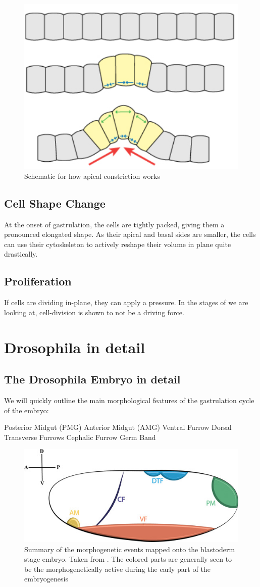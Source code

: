 \begin{figure}[H]
    \centering
    \includegraphics[width=0.3\linewidth]{chapters/Theory/figures/apical_constriction_schematic.png}
    \caption{Schematic for how apical constriction works}
    \label{fig:apical-constriction}
\end{figure}


\subsection{Cell Shape Change}
At the onset of gastrulation, the cells are tightly packed, giving them a pronounced elongated shape. As their apical and basal sides are smaller, the cells can use their cytoskeleton to actively reshape their volume in plane quite drastically. 

\subsection{Proliferation}
If cells are dividing in-plane, they can apply a pressure. In the stages of we are looking at, cell-division is shown to not be a driving force.

\section{Drosophila in detail}
\subsection{The Drosophila Embryo in detail}
\label{sec:drosophila-embryo-detail} 
We will quickly outline the main morphological features of the gastrulation cycle of the embryo:
\begin{outline}
    \1 Posterior Midgut (PMG)
    \1 Anterior Midgut (AMG)
    \1 Ventral Furrow
    \1 Dorsal Transverse Furrows
    \1 Cephalic Furrow
    \1 Germ Band
\end{outline}

\begin{figure}[H]
    \centering
    \includegraphics[width = 0.7\linewidth]{chapters/Theory/figures/morphogenic_events.jpg}
    \caption{Summary of the morphogenetic events mapped onto the blastoderm stage embryo. Taken from \cite{gheisari2020gastrulation}. The colored parts are generally seen to be the morphogenetically active during the early part of the embryogenesis}
    \label{fig:enter-label}
\end{figure}

